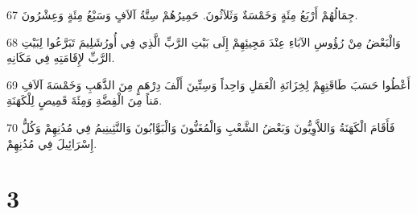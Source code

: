 \par 67 جِمَالُهُمْ أَرْبَعُ مِئَةٍ وَخَمْسَةٌ وَثَلاَثُونَ. حَمِيرُهُمْ سِتَّةُ آلاَفٍ وَسَبْعُ مِئَةٍ وَعِشْرُونَ.
\par 68 وَالْبَعْضُ مِنْ رُؤُوسِ الآبَاءِ عِنْدَ مَجِيئِهِمْ إِلَى بَيْتِ الرَّبِّ الَّذِي فِي أُورُشَلِيمَ تَبَرَّعُوا لِبَيْتِ الرَّبِّ لإِقَامَتِهِ فِي مَكَانِهِ.
\par 69 أَعْطُوا حَسَبَ طَاقَتِهِمْ لِخِزَانَةِ الْعَمَلِ وَاحِداً وَسِتِّينَ أَلْفَ دِرْهَمٍ مِنَ الذَّهَبِ وَخَمْسَةَ آلاَفِ مَناً مِنَ الْفِضَّةِ وَمِئَةَ قَمِيصٍ لِلْكَهَنَةِ.
\par 70 فَأَقَامَ الْكَهَنَةُ وَاللاَّوِيُّونَ وَبَعْضُ الشَّعْبِ وَالْمُغَنُّونَ وَالْبَوَّابُونَ وَالنَّثِينِيمُ فِي مُدُنِهِمْ وَكُلُّ إِسْرَائِيلَ فِي مُدُنِهِمْ.

\chapter{3}

